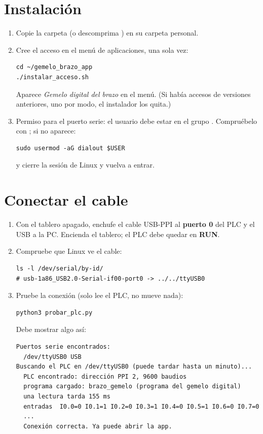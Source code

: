 \documentclass[a4paper,11pt]{article}
\begin{document}
\section{Instalación}
\begin{enumerate}
\item Copie la carpeta  (o descomprima ) en su carpeta personal.
\item Cree el acceso en el menú de aplicaciones, una sola vez:
\begin{lstlisting}
cd ~/gemelo_brazo_app
./instalar_acceso.sh
\end{lstlisting}
Aparece \emph{Gemelo digital del brazo} en el menú. (Si había accesos de versiones anteriores, uno por modo, el instalador los quita.)
\item Permiso para el puerto serie: el usuario debe estar en el grupo . Compruébelo con ; si no aparece:
\begin{lstlisting}
sudo usermod -aG dialout $USER
\end{lstlisting}
y cierre la sesión de Linux y vuelva a entrar.
\end{enumerate}


\section{Conectar el cable}
\begin{enumerate}
\item Con el tablero apagado, enchufe el cable USB-PPI al \textbf{puerto 0} del PLC y el USB a la PC. Encienda el tablero; el PLC debe quedar en \textbf{RUN}.
\item Compruebe que Linux ve el cable:
\begin{lstlisting}
ls -l /dev/serial/by-id/
# usb-1a86_USB2.0-Serial-if00-port0 -> ../../ttyUSB0
\end{lstlisting}
\item Pruebe la conexión (solo lee el PLC, no mueve nada):
\begin{lstlisting}
python3 probar_plc.py
\end{lstlisting}
Debe mostrar algo así:
\begin{lstlisting}
Puertos serie encontrados:
  /dev/ttyUSB0 USB
Buscando el PLC en /dev/ttyUSB0 (puede tardar hasta un minuto)...
  PLC encontrado: dirección PPI 2, 9600 baudios
  programa cargado: brazo_gemelo (programa del gemelo digital)
  una lectura tarda 155 ms
  entradas  I0.0=0 I0.1=1 I0.2=0 I0.3=1 I0.4=0 I0.5=1 I0.6=0 I0.7=0
  ...
  Conexión correcta. Ya puede abrir la app.
\end{lstlisting}
\end{enumerate}
\end{document}
